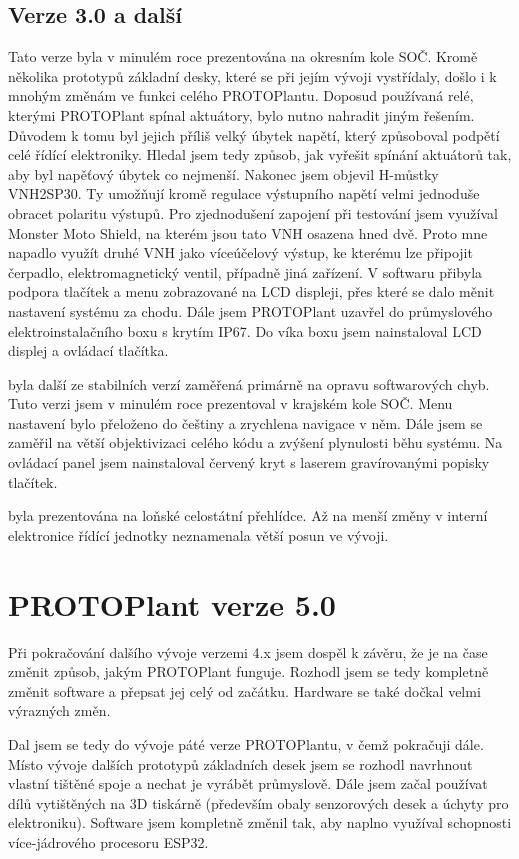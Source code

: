 \subsection{Verze 3.0 a další}
Tato verze byla v minulém roce prezentována na okresním kole SOČ.
Kromě několika prototypů základní desky, které se při jejím vývoji vystřídaly, došlo i k mnohým změnám ve funkci celého PROTOPlantu.
Doposud používaná relé, kterými PROTOPlant spínal aktuátory, bylo nutno nahradit jiným řešením.
Důvodem k tomu byl jejich příliš velký úbytek napětí, který způsoboval podpětí celé řídící elektroniky.
Hledal jsem tedy způsob, jak vyřešit spínání aktuátorů tak, aby byl napěťový úbytek co nejmenší.
Nakonec jsem objevil H-můstky VNH2SP30. 
Ty umožňují kromě regulace výstupního napětí velmi jednoduše obracet polaritu výstupů.
Pro zjednodušení zapojení při testování jsem využíval Monster Moto Shield, na kterém jsou tato VNH osazena hned dvě.
Proto mne napadlo využít druhé VNH jako víceúčelový výstup, ke kterému lze připojit čerpadlo, elektromagnetický ventil, případně jiná zařízení.
V softwaru přibyla podpora tlačítek a menu zobrazované na LCD displeji, přes které se dalo měnit nastavení systému za chodu.
Dále jsem PROTOPlant uzavřel do průmyslového elektroinstalačního boxu s krytím IP67.
Do víka boxu jsem nainstaloval LCD displej a ovládací tlačítka.
\newline

\noindent{} byla další ze stabilních verzí zaměřená primárně na opravu softwarových chyb.
Tuto verzi jsem v minulém roce prezentoval v krajském kole SOČ.
Menu nastavení bylo přeloženo do češtiny a zrychlena navigace v něm.
Dále jsem se zaměřil na větší objektivizaci celého kódu a zvýšení plynulosti běhu systému.
Na ovládací panel jsem nainstaloval červený kryt s laserem gravírovanými popisky tlačítek.
\newline

\noindent{} byla prezentována na loňské celostátní přehlídce.
Až na menší změny v interní elektronice řídící jednotky neznamenala větší posun ve vývoji.

\section{PROTOPlant verze 5.0}
Při pokračování dalšího vývoje verzemi 4.x jsem dospěl k závěru, že je na čase změnit způsob, jakým PROTOPlant funguje.
Rozhodl jsem se tedy kompletně změnit software a přepsat jej celý od začátku.
Hardware se také dočkal velmi výrazných změn.

Dal jsem se tedy do vývoje páté verze PROTOPlantu, v čemž pokračuji dále.
Místo vývoje dalších prototypů základních desek jsem se rozhodl navrhnout vlastní tištěné spoje a nechat je vyrábět průmyslově.
Dále jsem začal používat dílů vytištěných na 3D tiskárně (především obaly senzorových desek a úchyty pro elektroniku).
Software jsem kompletně změnil tak, aby naplno využíval schopnosti více-jádrového procesoru ESP32.

\newpage